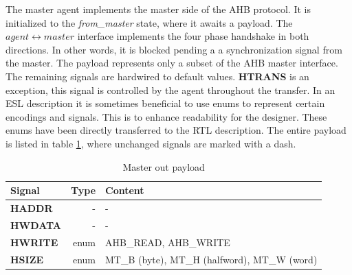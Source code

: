 The master agent implements the master side of the AHB protocol. It is initialized to the \textit{from\_master} state, where it awaits a payload. The $agent\leftrightarrow master$ interface implements the four phase handshake in both directions. In other words, it is blocked pending a a synchronization signal from the master. The payload represents only a subset of the AHB master interface. The remaining signals are hardwired to default values. \textbf{HTRANS} is an exception, this signal is controlled by the agent throughout the transfer. In an ESL description it is sometimes beneficial to use enums to represent certain encodings and signals. This is to enhance readability for the designer. These enums have been directly transferred to the RTL description. The entire payload is listed in table \ref{tab:mpayload}, where unchanged signals are marked with a dash.  

\begin{table}[hbt] 
  \label{tab:mpayload}
  \begin{tabular}{|p{25mm}|r|p{10cm}|} 
  \hline
  \textbf{Signal} & \textbf{Type} & \textbf{Content} \\
    \hline
  \textbf{HADDR} & - & - \\
    \hline
  \textbf{HWDATA} & - & - \\
    \hline
  \textbf{HWRITE} & enum & AHB\_READ, AHB\_WRITE \\
    \hline  
\textbf{HSIZE} & enum & MT\_B (byte), MT\_H (halfword), MT\_W (word) \\
    \hline
  \end{tabular}
\caption{Master out payload}
\end{table}

